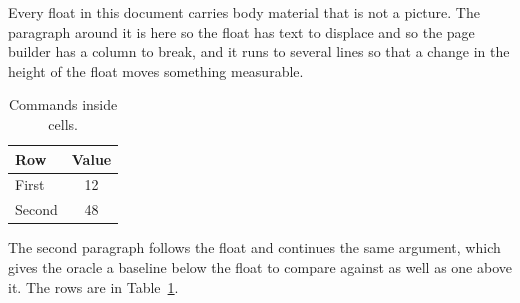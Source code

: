 \documentclass{article}
\begin{document}
Every float in this document carries body material that is not a
picture. The paragraph around it is here so the float has text to displace and
so the page builder has a column to break, and it runs to several lines so that
a change in the height of the float moves something measurable.

\begin{table}[h]
\centering
\begin{tabular}{|l|c|}
\hline
Row & Value \\
\hline
First\label{row:first} & 12 \\
Second\label{row:second} & 48 \\
\hline
\end{tabular}
\caption{Commands inside cells.}
\label{tab:cells}
\end{table}

The second paragraph follows the float and continues the same
argument, which gives the oracle a baseline below the float to compare against
as well as one above it. The rows are in Table~\ref{tab:cells}.
\end{document}
